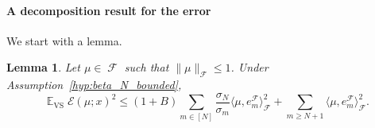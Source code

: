 \documentclass[twoside,11pt]{book}
\newtheorem{lemma}{Lemma}
\DeclareMathOperator{\VS}{\mathrm{VS}}
\DeclareMathOperator{\EX}{\mathbb{E}}
\DeclareMathOperator{\F}{\mathcal{F}}
\newcommand{\rb}[1]{\textcolor{magenta}{#1}}
\begin{document}
\paragraph{A decomposition result for the error}
We start with a lemma.
\begin{lemma}\label{lemma:delayed_bounds}
Let $\mu \in \F$ such that $\|\mu\|_{\F} \leq 1$. Under Assumption~\ref{hyp:beta_N_bounded},
\begin{equation}\label{eq:EX_VS_slow_rates}
\EX_{\VS} \mathcal{E}(\mu;x)^{2} \leq (1+B) \sum\limits_{m \in [N]} \frac{\sigma_{N}}{\sigma_{m}} \langle \mu,e_{m}^{\F} \rangle_{\F}^{2} + \sum\limits_{m \geq N+1} \langle \mu,e_{m}^{\F} \rangle_{\F}^{2}.
\end{equation}
\end{lemma}
\end{document}
